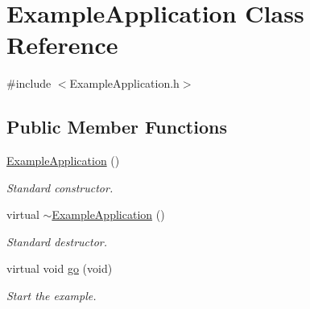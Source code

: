 \hypertarget{class_example_application}{
\section{ExampleApplication Class Reference}
\label{class_example_application}
}


{\ttfamily \#include $<$ExampleApplication.h$>$}\subsection*{Public Member Functions}
\begin{DoxyCompactItemize}
\item 
\hypertarget{class_example_application_a3fb3b3b1dd4820cc3290944879ecb6d2}{
\hyperlink{class_example_application_a3fb3b3b1dd4820cc3290944879ecb6d2}{ExampleApplication} ()}
\label{class_example_application_a3fb3b3b1dd4820cc3290944879ecb6d2}

\begin{DoxyCompactList}\small\item\em Standard constructor. \item\end{DoxyCompactList}\item 
\hypertarget{class_example_application_a2a3cf22fe76dd76425f16d6e5074a76a}{
virtual \hyperlink{class_example_application_a2a3cf22fe76dd76425f16d6e5074a76a}{$\sim$ExampleApplication} ()}
\label{class_example_application_a2a3cf22fe76dd76425f16d6e5074a76a}

\begin{DoxyCompactList}\small\item\em Standard destructor. \item\end{DoxyCompactList}\item 
\hypertarget{class_example_application_a9fea57d467f9f60e76651f638a3470da}{
virtual void \hyperlink{class_example_application_a9fea57d467f9f60e76651f638a3470da}{go} (void)}
\label{class_example_application_a9fea57d467f9f60e76651f638a3470da}

\begin{DoxyCompactList}\small\item\em Start the example. \item\end{DoxyCompactList}\end{DoxyCompactItemize}
